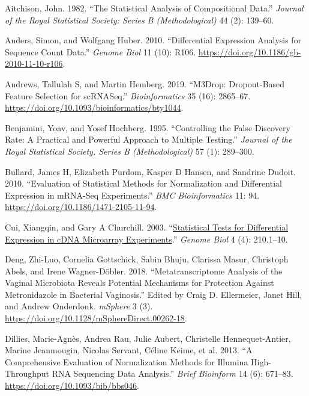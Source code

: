 \documentclass[
]{article}
\newlength{\cslhangindent}
\newlength{\cslentryspacingunit} %
\newenvironment{CSLReferences}[2] %
 {%
  \setlength{\parindent}{0pt}
  \ifodd #1
  \let\oldpar\par
  \def\par{\hangindent=\cslhangindent\oldpar}
  \fi
  \setlength{\parskip}{#2\cslentryspacingunit}
 }%
 {}
\begin{document}
\hypertarget{refs}{}
\begin{CSLReferences}{1}{0}
\leavevmode{}%
Aitchison, John. 1982. {``The Statistical Analysis of Compositional
Data.''} \emph{Journal of the Royal Statistical Society: Series B
(Methodological)} 44 (2): 139--60.

\leavevmode{}%
Anders, Simon, and Wolfgang Huber. 2010. {``Differential Expression
Analysis for Sequence Count Data.''} \emph{Genome Biol} 11 (10): R106.
\url{https://doi.org/10.1186/gb-2010-11-10-r106}.

\leavevmode{}%
Andrews, Tallulah S, and Martin Hemberg. 2019. {``M3Drop: Dropout-Based
Feature Selection for scRNASeq.''} \emph{Bioinformatics} 35 (16):
2865--67. \url{https://doi.org/10.1093/bioinformatics/bty1044}.

\leavevmode{}%
Benjamini, Yoav, and Yosef Hochberg. 1995. {``Controlling the False
Discovery Rate: A Practical and Powerful Approach to Multiple
Testing.''} \emph{Journal of the Royal Statistical Society. Series B
(Methodological)} 57 (1): 289--300.

\leavevmode{}%
Bullard, James H, Elizabeth Purdom, Kasper D Hansen, and Sandrine
Dudoit. 2010. {``Evaluation of Statistical Methods for Normalization and
Differential Expression in m{RNA-Seq} Experiments.''} \emph{BMC
Bioinformatics} 11: 94. \url{https://doi.org/10.1186/1471-2105-11-94}.

\leavevmode{}%
Cui, Xiangqin, and Gary A Churchill. 2003.
{``\href{https://www.ncbi.nlm.nih.gov/pubmed/12702200}{Statistical Tests
for Differential Expression in cDNA Microarray Experiments}.''}
\emph{Genome Biol} 4 (4): 210.1--10.

\leavevmode{}%
Deng, Zhi-Luo, Cornelia Gottschick, Sabin Bhuju, Clarissa Masur,
Christoph Abels, and Irene Wagner-Döbler. 2018. {``Metatranscriptome
Analysis of the Vaginal Microbiota Reveals Potential Mechanisms for
Protection Against Metronidazole in Bacterial Vaginosis.''} Edited by
Craig D. Ellermeier, Janet Hill, and Andrew Onderdonk. \emph{mSphere} 3
(3). \url{https://doi.org/10.1128/mSphereDirect.00262-18}.

\leavevmode{}%
Dillies, Marie-Agnès, Andrea Rau, Julie Aubert, Christelle
Hennequet-Antier, Marine Jeanmougin, Nicolas Servant, Céline Keime, et
al. 2013. {``A Comprehensive Evaluation of Normalization Methods for
{Illumina} High-Throughput {RNA} Sequencing Data Analysis.''}
\emph{Brief Bioinform} 14 (6): 671--83.
\url{https://doi.org/10.1093/bib/bbs046}.


\end{CSLReferences}
\end{document}
